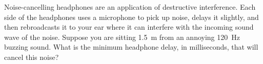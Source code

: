 \documentclass[a4paper]{exam}
\begin{document}
\begin{questions}
    \question Noise-cancelling headphones are an application of destructive interference. Each side of the headphones uses a microphone
              to pick up noise, delays it slightly, and then rebroadcasts it to your ear where it can interfere with the incoming sound
              wave of the noise. Suppose you are sitting \SI{1.5}{\metre} from an annoying \SI{120}{\hertz} buzzing sound. What is the
              minimum headphone delay, in milliseconds, that will cancel this noise?
  \end{questions}
\end{document}
